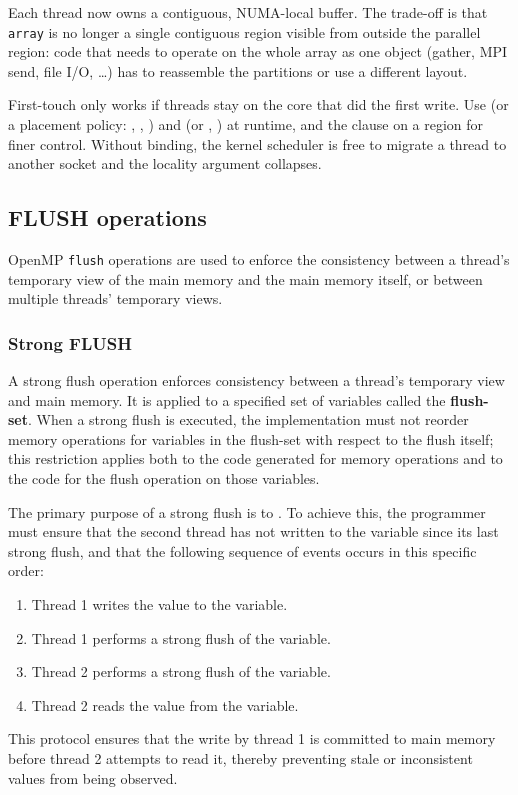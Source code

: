 Each thread now owns a contiguous, NUMA-local buffer. The trade-off is that \texttt{array} is no longer a single contiguous region visible from outside the parallel region: code that needs to operate on the whole array as one object (gather, MPI send, file I/O, \dots) has to reassemble the partitions or use a different layout.

\begin{tipsblock}
First-touch only works if threads stay on the core that did the first write. Use  (or a placement policy: , , ) and  (or , ) at runtime, and the  clause on a  region for finer control. Without binding, the kernel scheduler is free to migrate a thread to another socket and the locality argument collapses.
\end{tipsblock}

\subsection{FLUSH operations}

OpenMP \texttt{flush} operations are used to enforce the consistency between a thread's temporary view of the main memory and the main memory itself, or between multiple threads' temporary views.

\subsubsection{Strong FLUSH}

A strong flush operation enforces consistency between a thread's temporary view and main memory. It is applied to a specified set of variables called the \textbf{flush-set}. When a strong flush is executed, the implementation must not reorder memory operations for variables in the flush-set with respect to the flush itself; this restriction applies both to the code generated for memory operations and to the code for the flush operation on those variables.

The primary purpose of a strong flush is to . To achieve this, the programmer must ensure that the second thread has not written to the variable since its last strong flush, and that the following sequence of events occurs in this specific order:
\begin{enumerate}
    \item Thread 1 writes the value to the variable.
    \item Thread 1 performs a strong flush of the variable.
    \item Thread 2 performs a strong flush of the variable.
    \item Thread 2 reads the value from the variable.
\end{enumerate}
This protocol ensures that the write by thread 1 is committed to main memory before thread 2 attempts to read it, thereby preventing stale or inconsistent values from being observed.

